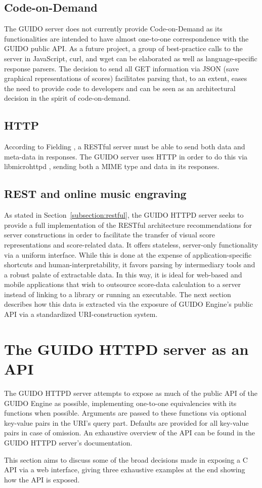 \documentclass{article}
\begin{document}
\subsection{Code-on-Demand}
The GUIDO server does not currently provide Code-on-Demand as its functionalities are intended to have almost one-to-one correspondence with the GUIDO public API.  As a future project, a group of best-practice calls to the server in JavaScript, curl, and wget can be elaborated as well as language-specific response parsers.  The decision to send all GET information via JSON (save graphical representations of scores) facilitates parsing that, to an extent, eases the need to provide code to developers and can be seen as an architectural decision in the spirit of code-on-demand.
\subsection{HTTP}
According to Fielding \cite{Fielding00}, a RESTful server must be able to send both data and meta-data in responses.  The GUIDO server uses HTTP in order to do this via libmicrohttpd \cite{libmicrohttpd}, sending both a MIME type and data in its responses.
\subsection{REST and online music engraving}
As stated in Section~\ref{subsection:restful}, the GUIDO HTTPD server seeks to provide a full implementation of the RESTful architecture recommendations for server constructions in order to facilitate the transfer of visual score representations and score-related data.  It offers stateless, server-only functionality via a uniform interface.  While this is done at the expense of application-specific shortcuts and human-interpretability, it favors parsing by intermediary tools and a robust palate of extractable data.  In this way, it is ideal for web-based and mobile applications that wish to outsource score-data calculation to a server instead of linking to a library or running an executable.  The next section describes how this data is extracted via the exposure of GUIDO Engine's public API via a standardized URI-construction system.
\section{The GUIDO HTTPD server as an API}\label{section:guido-api}
The GUIDO HTTPD server attempts to expose as much of the public API of the GUIDO Engine as possible, implementing one-to-one equivalencies with its functions when possible.  Arguments are passed to these functions via optional key-value pairs in the URI's query part.  Defaults are provided for all key-value pairs in case of omission.  An exhaustive overview of the API can be found in the GUIDO HTTPD server's documentation\cite{guidoserverdoc}.\par
This section aims to discuss some of the broad decisions made in exposing a C API via a web interface, giving three exhaustive examples at the end showing how the API is exposed.
\end{document}
